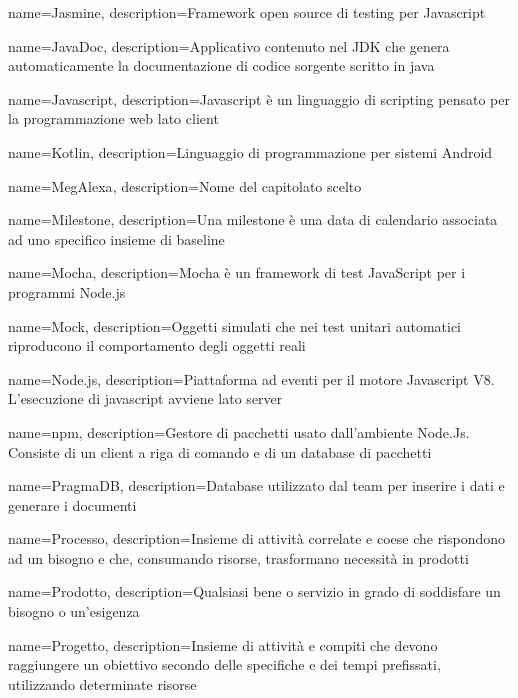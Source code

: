 {
	name={Jasmine},
	description={Framework open source di testing per Javascript}
}

{
	name={JavaDoc},
	description={Applicativo contenuto nel JDK che genera automaticamente la documentazione di codice sorgente scritto in java}
}

{
	name={Javascript},
	description={Javascript è un linguaggio di scripting pensato per la programmazione web lato client}
	{\pagebreak}
}

{
	name={Kotlin},
	description={Linguaggio di programmazione per sistemi Android}
	{\pagebreak}
}

{
	name={MegAlexa},
	description={Nome del capitolato scelto}
}

{
	name={Milestone},
	description={Una milestone è una data di calendario associata ad uno specifico insieme di baseline}
}

{
	name={Mocha},
	description={Mocha è un framework di test JavaScript per i programmi Node.js}
}

{
	name={Mock},
	description={Oggetti simulati che nei test unitari automatici riproducono il comportamento degli oggetti reali}
	{\pagebreak}
}

{
	name={Node.js},
	description={Piattaforma ad eventi per il motore Javascript V8. L’esecuzione di javascript avviene lato server}
}

{
	name={npm},
	description={Gestore di pacchetti usato dall'ambiente Node.Js. Consiste di un client a riga di comando e di un database di pacchetti}
	{\pagebreak}
}

{
	name={PragmaDB},
	description={Database utilizzato dal team per inserire i dati e generare i documenti}
}

{
	name={Processo},
	description={Insieme di attività correlate e coese che rispondono ad un bisogno e che, consumando risorse, trasformano necessità in prodotti}
}

{
	name={Prodotto},
	description={Qualsiasi bene o servizio in grado di soddisfare un bisogno o un’esigenza}
}

{
	name={Progetto},
	description={Insieme di attività e compiti che devono raggiungere un obiettivo secondo delle specifiche e dei tempi prefissati, utilizzando determinate risorse}
}

